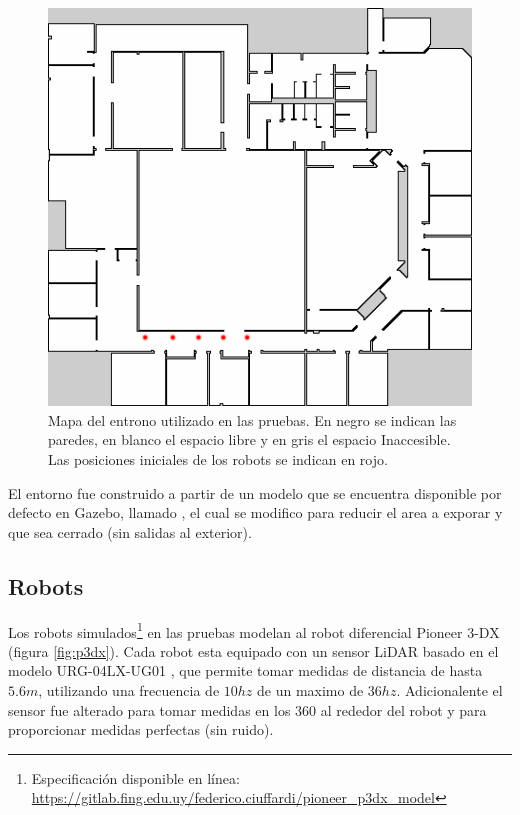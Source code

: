 \begin{figure}[H]
  \center
  \includegraphics[width=0.5\linewidth]{imagenes/willow/0_250000mRobots2.png}
  \caption[Mapa del entrono utilizado en las pruebas.]{Mapa del entrono utilizado en las pruebas. En negro se indican las paredes, en blanco el espacio libre y en gris el espacio Inaccesible. Las posiciones iniciales de los robots se indican en rojo.}
  \label{fig:willow}
\end{figure} 

El entorno fue construido a partir de un modelo que se encuentra disponible por
defecto en Gazebo, llamado , el cual se modifico para
reducir el area a exporar y que sea cerrado (sin salidas al exterior).

\subsection{Robots}
Los robots simulados\footnote{Especificación disponible en línea:
\url{https://gitlab.fing.edu.uy/federico.ciuffardi/pioneer_p3dx_model}} en las
pruebas modelan al robot diferencial Pioneer 3-DX \cite{p3dx} (figura
\ref{fig:p3dx}). Cada robot esta equipado con un sensor LiDAR basado en el
modelo URG-04LX-UG01 \cite{hokuyo}, que permite tomar medidas de distancia de
hasta $5.6m$, utilizando una frecuencia de $10hz$ de un maximo de $36hz$.
Adicionalente el sensor fue alterado para tomar medidas en los $360$\textdegree
al rededor del robot y para proporcionar medidas perfectas (sin ruido).

